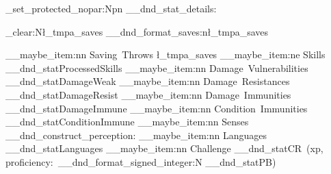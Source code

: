 \cs_set_protected_nopar:Npn \LEGACY__dnd_stat_details:
{
	\tl_clear:N\l_tmpa_saves
	\LEGACY__dnd_format_saves:n{\l_tmpa_saves}
	\begin {description}[
		before   = \color {StatblockHeading},
		font     = \RpgFontStatBlockBody\color {StatblockHeading},
		labelsep = \__rpg_SpaceDim,
		nosep]

	\__maybe_item:nn {Saving~Throws}			{\l_tmpa_saves}
	\__maybe_item:ne {Skills}					{\__dnd_statProcessedSkills}
	\__maybe_item:nn {Damage~Vulnerabilities}	{\__dnd_statDamageWeak}
	\__maybe_item:nn {Damage~Resistances}		{\__dnd_statDamageResist}
	\__maybe_item:nn {Damage~Immunities}		{\__dnd_statDamageImmune}
	\__maybe_item:nn {Condition~Immunities}		{\__dnd_statConditionImmune}
	\__maybe_item:nn {Senses}					{\__dnd_construct_perception:}
	\__maybe_item:nn {Languages}				{\__dnd_statLanguages}
	\__maybe_item:nn {Challenge}				{\__dnd_statCR{}~(xp,~ proficiency:~\__dnd_format_signed_integer:N {\__dnd_statPB})}
	\end {description}
}

